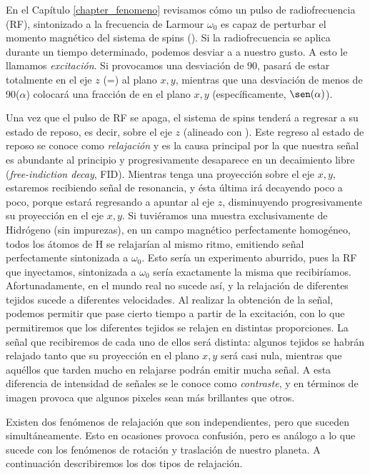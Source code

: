 En el Capítulo \ref{chapter_fenomeno} revisamos cómo un pulso de 
radiofrecuencia (RF), sintonizado a la frecuencia de Larmour $\omega_0$ es 
capaz de perturbar el momento magnético del sistema de spins (\M). Si la 
radiofrecuencia se aplica durante un tiempo determinado, podemos desviar a \M
a nuestro gusto. A esto le llamamos 
\textit{excitación}. Si provocamos una desviación de 90\degrees, \M
pasará de estar totalmente en el eje $z$ (\Mz=\M) al plano $x,y$, mientras que una  desviación de menos de 90\degrees ($\alpha$\degrees) colocará una fracción de \M en el plano $x,y$ (específicamente, $\sen(\alpha)$).

Una vez que el pulso de RF se apaga, el sistema de spins tenderá a regresar a 
su estado de reposo, es decir, sobre el eje $z$ (alineado con \Bzero). Este 
regreso al estado de reposo se conoce como \textit{relajación} y es la causa principal por la que nuestra señal es abundante al principio y progresivamente desaparece en un decaimiento libre (\textit{free-indiction decay}, FID). Mientras  \M tenga una proyección sobre el eje $x,y$, estaremos recibiendo señal de resonancia, y ésta última irá decayendo poco a poco, porque \M estará regresando a apuntar al eje $z$, disminuyendo progresivamente su proyección en el eje $x,y$. Si tuviéramos una muestra exclusivamente de 
Hidrógeno (sin impurezas), en un campo magnético perfectamente homogéneo, todos 
los átomos de H se relajarían al mismo ritmo, emitiendo señal perfectamente 
sintonizada a $\omega_0$. Esto sería un experimento aburrido, pues la RF que 
inyectamos, sintonizada a $\omega_0$ sería exactamente la misma que 
recibiríamos. Afortunadamente, en el mundo real no sucede así, y la relajación 
de diferentes tejidos sucede a diferentes velocidades. Al realizar la obtención 
de la señal, podemos permitir que pase cierto tiempo a partir de la excitación, 
con lo que permitiremos que los diferentes tejidos se relajen en distintas 
proporciones. La señal que recibiremos de cada uno de ellos será 
distinta: algunos tejidos se habrán relajado tanto que su proyección en el 
plano $x,y$ será casi nula, mientras que aquéllos que tarden mucho en relajarse 
podrán emitir mucha señal. A esta diferencia de intensidad de señales se le 
conoce como \textit{contraste}, y en términos de imagen provoca que algunos 
pixeles sean más brillantes que otros.

Existen dos fenómenos de relajación  que son independientes, pero que 
suceden simultáneamente. Esto en ocasiones provoca confusión, pero es análogo a 
lo que sucede con los fenómenos de rotación y traslación de nuestro planeta. A 
continuación describiremos los dos tipos de relajación.

